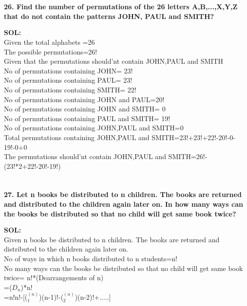 \documentclass[8pt,a4paper]{article}
\begin{document}
\section{}

\textbf{26. Find the number of permutations of the 26 letters A,B,...,X,Y,Z that do not contain the
patterns JOHN, PAUL and SMITH?}

\textbf{SOL:}\\Given the total alphabets =26\\
The possible permutations=26!\\
Given that the permutations should'nt contain JOHN,PAUL and SMITH\\
 No of  permutations containing JOHN= 23!\\
 No of  permutations containing PAUL= 23!\\
 No of  permutations containing SMITH= 22!\\
 No of  permutations containing JOHN and PAUL=20!\\
 No of  permutations containing JOHN and SMITH= 0\\
 No of  permutations containing PAUL and SMITH= 19!\\
 No of  permutations containing JOHN,PAUL and SMITH=0\\
 Total permutations containing JOHN,PAUL and SMITH=23!+23!+22!-20!-0-19!-0+0\\
 The permutations should'nt contain JOHN,PAUL and SMITH=26!-(23!*2+22!-20!-19!)\\

\section{}

\textbf{27. Let n books be distributed to n children. The books are returned and distributed to the
children again later on. In how many ways can the books be distributed so that no child
will get same book twice?}

\textbf{SOL:}\\
  Given n books be distributed to n children. The books are returned and distributed to the
children again later on. \\
No of ways in which n books distributed to n students=n!\\
No many ways can the books be distributed so that no child
will get same book twice= n!*(Dearrangements of n)\\
                        =($D_n$)*n!\\
                        =n!{n!-[($^(n)_1$)(n-1)!-($^(n)_2$)(n-2)!+.....]}\\
												
\end{document}
